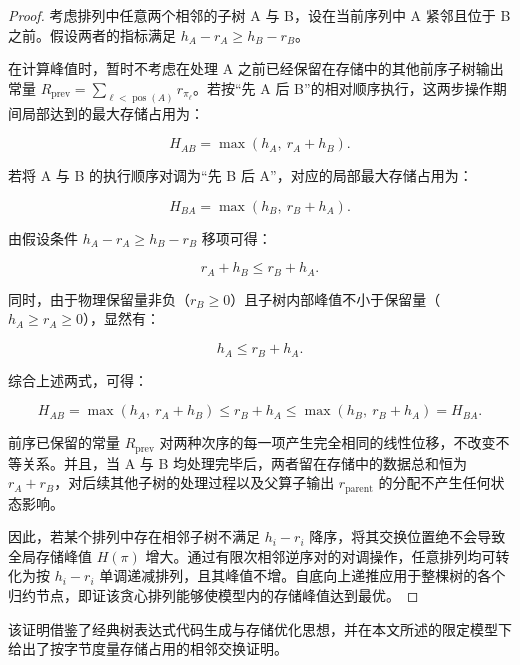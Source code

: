 \documentclass[anonymous,notoc]{gmcm2026}
\begin{document}
\begin{proof} 考虑排列中任意两个相邻的子树 A 与 B，设在当前序列中 A 紧邻且位于 B 之前。假设两者的指标满足 \(h_A - r_A \ge h_B - r_B\)。

在计算峰值时，暂时不考虑在处理 A 之前已经保留在存储中的其他前序子树输出常量 \(R_{\mathrm{prev}} = \sum_{\ell < \operatorname{pos}(A)} r_{\pi_\ell}\)。若按``先 A 后 B''的相对顺序执行，这两步操作期间局部达到的最大存储占用为：

\begin{equation}
H_{AB} = \max(h_A, \ r_A + h_B).
\end{equation}

若将 A 与 B 的执行顺序对调为``先 B 后 A''，对应的局部最大存储占用为：

\begin{equation}
H_{BA} = \max(h_B, \ r_B + h_A).
\end{equation}

由假设条件 \(h_A - r_A \ge h_B - r_B\) 移项可得：

\begin{equation}
r_A + h_B \le r_B + h_A.
\end{equation}

同时，由于物理保留量非负（\(r_B \ge 0\)）且子树内部峰值不小于保留量（\(h_A \ge r_A \ge 0\)），显然有：

\begin{equation}
h_A \le r_B + h_A.
\end{equation}

综合上述两式，可得：

\begin{equation}
H_{AB} = \max(h_A, \ r_A + h_B) \le r_B + h_A \le \max(h_B, \ r_B + h_A) = H_{BA}.
\end{equation}

前序已保留的常量 \(R_{\mathrm{prev}}\) 对两种次序的每一项产生完全相同的线性位移，不改变不等关系。并且，当 A 与 B 均处理完毕后，两者留在存储中的数据总和恒为 \(r_A + r_B\)，对后续其他子树的处理过程以及父算子输出 \(r_{\mathrm{parent}}\) 的分配不产生任何状态影响。

因此，若某个排列中存在相邻子树不满足 \(h_i - r_i\) 降序，将其交换位置绝不会导致全局存储峰值 \(H(\pi)\) 增大。通过有限次相邻逆序对的对调操作，任意排列均可转化为按 \(h_i - r_i\) 单调递减排列，且其峰值不增。自底向上递推应用于整棵树的各个归约节点，即证该贪心排列能够使模型内的存储峰值达到最优。 \end{proof}

该证明借鉴了经典树表达式代码生成与存储优化思想\cite{ref4}，并在本文所述的限定模型下给出了按字节度量存储占用的相邻交换证明。
\end{document}
